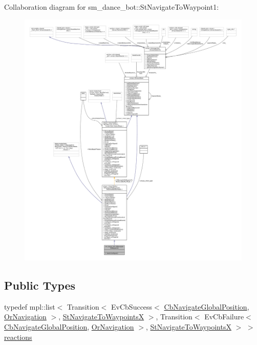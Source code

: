 Collaboration diagram for sm\+\_\+dance\+\_\+bot\+:\+:St\+Navigate\+To\+Waypoint1\+:
\nopagebreak
\begin{figure}[H]
\begin{center}
\leavevmode
\includegraphics[width=350pt]{structsm__dance__bot_1_1StNavigateToWaypoint1__coll__graph}
\end{center}
\end{figure}
\subsection*{Public Types}
\begin{DoxyCompactItemize}
\item 
typedef mpl\+::list$<$ Transition$<$ Ev\+Cb\+Success$<$ \hyperlink{classcl__move__base__z_1_1CbNavigateGlobalPosition}{Cb\+Navigate\+Global\+Position}, \hyperlink{classsm__dance__bot_1_1OrNavigation}{Or\+Navigation} $>$, \hyperlink{structsm__dance__bot_1_1StNavigateToWaypointsX}{St\+Navigate\+To\+WaypointsX} $>$, Transition$<$ Ev\+Cb\+Failure$<$ \hyperlink{classcl__move__base__z_1_1CbNavigateGlobalPosition}{Cb\+Navigate\+Global\+Position}, \hyperlink{classsm__dance__bot_1_1OrNavigation}{Or\+Navigation} $>$, \hyperlink{structsm__dance__bot_1_1StNavigateToWaypointsX}{St\+Navigate\+To\+WaypointsX} $>$ $>$ \hyperlink{structsm__dance__bot_1_1StNavigateToWaypoint1_a97717f60fbf1d73dafe96f9af8718d78}{reactions}
\end{DoxyCompactItemize}
